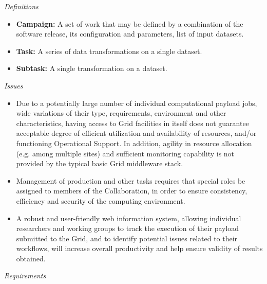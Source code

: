 \noindent \textit{Definitions}
\begin{itemize}
\item \textbf{Campaign:} A set of work that may be defined by a combination of the software release, its configuration
and parameters, list of input datasets.

\item  \textbf{Task:} A series of data transformations on a single dataset.

\item \textbf{Subtask:} A single transformation on a dataset.

\end{itemize}


\noindent
\textit{Issues}
\begin{itemize}
	\item Due to a potentially  large number of individual computational payload jobs, wide variations of their type, requirements,
	environment and other  characteristics, having access to Grid facilities in itself does not guarantee acceptable degree
	of efficient utilization and availability of resources, and/or functioning Operational Support. In addition, agility in resource
	allocation (e.g. among multiple sites) and sufficient monitoring capability is not provided by the typical basic Grid middleware stack.

	\item Management of production and other tasks requires that special roles be assigned to members of the Collaboration,
	in order to ensure consistency, efficiency and security of the computing environment.
	
	\item A robust and user-friendly web information system, allowing individual researchers and working groups to track the execution of 
	their payload submitted to the Grid, and to identify potential issues related to their workflows, will increase overall productivity and help ensure validity of results obtained.
\end{itemize}
\noindent
\textit{Requirements}
